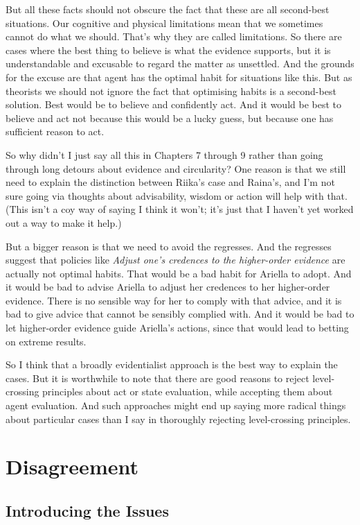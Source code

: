 But all these facts should not obscure the fact that these are all second-best situations. Our cognitive and physical limitations mean that we sometimes cannot do what we should. That's why they are called limitations. So there are cases where the best thing to believe is what the evidence supports, but it is understandable and excusable to regard the matter as unsettled. And the grounds for the excuse are that agent has the optimal habit for situations like this. But as theorists we should not ignore the fact that optimising habits is a second-best solution. Best would be to believe and confidently act. And it would be best to believe and act not because this would be a lucky guess, but because one has sufficient reason to act.

So why didn't I just say all this in Chapters 7 through 9 rather than going through long detours about evidence and circularity? One reason is that we still need to explain the distinction between \gls{Riika}'s case and Raina's, and I'm not sure going via thoughts about advisability, wisdom or action will help with that. (This isn't a coy way of saying I think it won't; it's just that I haven't yet worked out a way to make it help.)

But a bigger reason is that we need to avoid the regresses. And the regresses suggest that policies like \emph{Adjust one's credences to the higher-order evidence} are actually not optimal habits. That would be a bad habit for \gls{Ariella} to adopt. And it would be bad to advise \gls{Ariella} to adjust her credences to her higher-order evidence. There is no sensible way for her to comply with that advice, and it is bad to give advice that cannot be sensibly complied with. And it would be bad to let higher-order evidence guide \gls{Ariella}'s actions, since that would lead to betting on extreme results.

So I think that a broadly evidentialist approach is the best way to explain the cases. But it is worthwhile to note that there are good reasons to reject level-crossing principles about act or state evaluation, while accepting them about agent evaluation. And such approaches might end up saying more radical things about particular cases than I say in thoroughly rejecting level-crossing principles.

\chapter{Disagreement}
\label{disagreement}

\section{Introducing the Issues}
\label{introducingtheissues}

